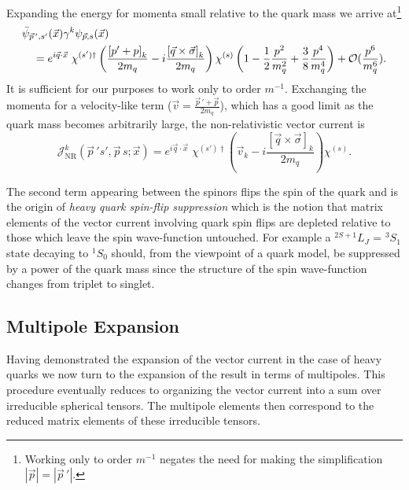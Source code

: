 Expanding the energy for momenta small relative to the quark mass we arrive at\footnote{Working only to order $m^{-1}$ negates the need for making the simplification $|\vec{p}| = |\vec{p}\,'|$.} 
\begin{align*}
&\bar{\psi}_{\vec{p}\,' ,s'}(\vec{x})  \gamma^k \psi_{\vec{p}, s}(\vec{x}) \\
&\quad= e^{i \vec{q}\cdot \vec{x}}  \;\chi^{(s')\dagger}\left(  \frac{\left[ p' + p\right]_k}{2m_q}  -i \frac{\left[\vec{q} \times \vec{\sigma} \right]_k}{2m_q} \right) \chi^{(s)} \left( 1 - \frac{1}{2} \frac{p^2}{m_q^2} + \frac{3}{8}\frac{p^4}{m_q^4}   \right) +  \mathcal{O}(\frac{p^6}{m_q^6}). 
\end{align*}
It is sufficient for our purposes to work only to order $m^{-1}$. Exchanging the momenta for a velocity-like term ($\vec{v} = \frac{ \vec{p}\,' + \vec{p}}{2m_q}$), which has a good limit as the quark mass becomes arbitrarily large, the non-relativistic vector current is 
\begin{equation}
\mathcal{J}^k_{\mathrm{NR}}(\vec{p}\,'s',\vec{p}\,s;\vec{x})= e^{i \vec{q} \cdot \vec{x}}  \;\chi^{(s')\dagger} \left(   \vec{v}_k -i \frac{\left[\vec{q} \times \vec{\sigma} \right]_k}{2m_q} \right) \chi^{(s)}. \label{eqn::hq_vector_current_expansion}
\end{equation} 

The second term appearing between the spinors flips the spin of the quark and is the origin of \emph{heavy quark spin-flip suppression} which is the notion that matrix elements of the vector current involving quark spin flips are depleted relative to those which leave the spin wave-function untouched. For example  a $^{2S+1}L_J$ = $^3S_1$ state decaying to  $^1S_0$ should, from the viewpoint of a quark model, be suppressed by a power of the quark mass since the structure of the spin wave-function changes from triplet to singlet. 


\subsection{Multipole Expansion}
Having demonstrated the expansion of the vector current in the case of heavy quarks we now turn to the expansion of the result in terms of multipoles. This procedure eventually reduces to organizing the vector current into a sum over irreducible spherical tensors. The multipole elements then correspond to the reduced matrix elements of these irreducible tensors. 

